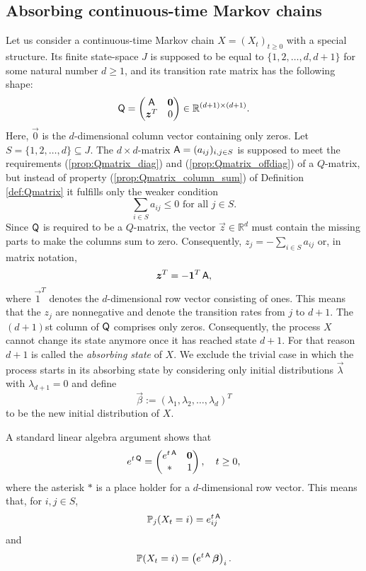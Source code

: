 \documentclass[smallextended]{svjour3}
\newcommand{\R}{\mathbb{R}}
\renewcommand{\P}{\mathbb{P}}
\newcommand{\suml}{\sum\limits}
\begin{document}
\subsection{Absorbing continuous-time Markov chains}

Let us consider a continuous-time Markov chain $X=(X_t)_{t\geq0}$ with a special structure.
Its finite state-space $J$ is supposed to be equal to $\{1,2,\ldots,d, d+1\}$ for some natural number $d\geq1$, and its transition rate matrix has the following shape:
\begin{equation}\label{eqn:Qabsorbing}
    \tens{Q}=\begin{pmatrix}\tens{A} & \vec{0} \\ \vec{z}^T  & 0 \end{pmatrix}\in\R^{(d+1)\times(d+1)}.
\end{equation}
Here, $\vec{0}$ is the $d$-dimensional column vector containing only zeros.
Let $S=\{1,2,\ldots,d\}\subseteq J$.
The $d\times d$-matrix $\mathsf{A}=(a_{ij})_{i,j\in S}$ is supposed to meet the requirements (\ref{prop:Qmatrix_diag}) and (\ref{prop:Qmatrix_offdiag}) of a $Q$-matrix, but instead of property (\ref{prop:Qmatrix_column_sum}) of Definition \ref{def:Qmatrix} it fulfills only the weaker condition
\[
    \suml_{i\in S} a_{ij} \leq 0\text{ for all }j\in S.
\]
Since $\mathsf{Q}$ is required to be a $Q$-matrix, the vector $\vec{z}\in \R^d$ must contain the missing parts to make the columns sum to zero.
Consequently, $z_j=-\sum_{i\in S} a_{ij}$ or, in matrix notation,
\begin{equation}\label{eqn:z}
    \vec{z}^T = -\vec{1}^T\,\tens{A},
\end{equation}
where $\vec{1}^T$ denotes the $d$-dimensional row vector consisting of ones.
This means that the $z_j$ are nonnegative and denote the transition rates from $j$ to $d+1$.
The $(d+1)$st column of $\mathsf{Q}$ comprises only zeros.
Consequently, the process $X$ cannot change its state anymore once it has reached state $d+1$.
For that reason $d+1$ is called the \emph{absorbing state} of $X$.
We exclude the trivial case in which the process starts in its absorbing state by considering only initial distributions $\vec{\lambda}$ with $\lambda_{d+1}=0$ and define
\begin{equation}\label{eqn:def_beta}
    \vec{\beta}:=(\lambda_1,\lambda_2,\ldots,\lambda_d)^T
\end{equation}
to be the new initial distribution of $X$.

A standard linear algebra argument shows that
\[
    e^{t\,\tens{Q}} = \begin{pmatrix} e^{t\,\tens{A}} & \vec{0} \\ \ast & 1\end{pmatrix},\quad t\geq0,
\]
where the asterisk $\ast$ is a place holder for a $d$-dimensional row vector.
This means that, for $i,j\in S$,
\[
    \P_j(X_t=i) = e^{t\,\tens{A}}_{ij}
\]
and
\begin{equation}\label{eqn:PX_t}
    \P(X_t=i) = \left(e^{t\,\tens{A}}\,\vec{\beta}\right)_i.
\end{equation}
\end{document}
